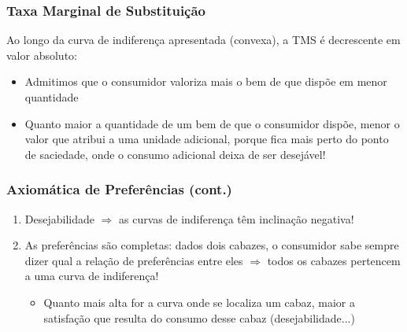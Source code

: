 \begin{frame}
\begin{center}
	\end{center}
\end{frame}

\begin{frame}
	\frametitle{Taxa Marginal de Substitui\c c\~ao}
	Ao longo da curva de indiferen\c ca apresentada (convexa), a TMS \'e decrescente em valor absoluto:
	\vspace{0.2cm}
	\begin{itemize}
		\item<2-> Admitimos que o consumidor valoriza mais o bem de que disp\~oe em menor quantidade
		\item<3-> Quanto maior a quantidade de um bem de que o consumidor disp\~oe, menor o valor que atribui a uma unidade adicional, porque fica mais perto do ponto de saciedade, onde o consumo adicional deixa de ser desej\'avel!
	\end{itemize}
\end{frame}

\begin{frame}
	\frametitle{Axiom\'atica de Prefer\^encias (cont.)}
	\begin{enumerate}
		\item<2->Desejabilidade $\Rightarrow$ as curvas de indiferen\c ca t\^em inclina\c c\~ao negativa!
		\item<3->As prefer\^encias s\~ao completas: dados dois cabazes, o consumidor sabe sempre dizer qual a rela\c c\~ao de prefer\^encias entre eles $\Rightarrow$ todos os cabazes pertencem a uma curva de indiferen\c ca!
		\begin{itemize}
			\item<4-> Quanto mais alta for a curva onde se localiza um cabaz, maior a satisfa\c c\~ao que resulta do consumo desse cabaz (desejabilidade...)
		\end{itemize}
	\end{enumerate}
\end{frame}

